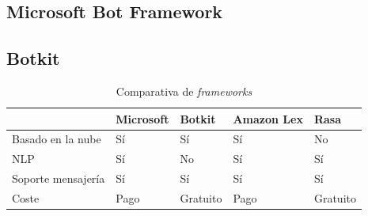 \subsection{Microsoft Bot Framework}


\subsection{Botkit}


\begin{table}[htbp]
\centering
\begin{tabular}{|l|l|l|l|l|} 
\hline
                   & Microsoft & Botkit   & Amazon Lex & Rasa      \\ 
\hline
Basado en la nube  & Sí        & Sí       & Sí         & No        \\ 
\hline
NLP                & Sí        & No       & Sí         & Sí        \\ 
\hline
Soporte mensajería & Sí        & Sí       & Sí         & Sí        \\ 
\hline
Coste              & Pago      & Gratuito & Pago       & Gratuito  \\
\hline
\end{tabular}
\caption{Comparativa de \textit{frameworks}}
\end{table}


